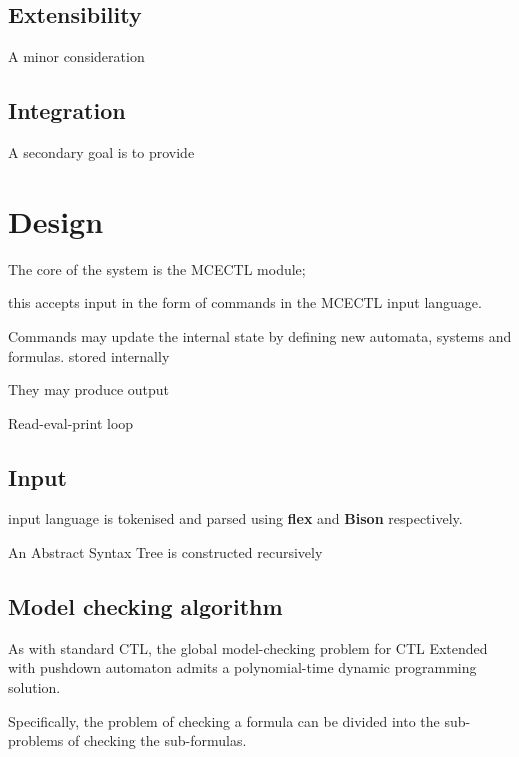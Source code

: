\documentclass[11pt]{article}
\begin{document}
\subsection{Extensibility}

A minor consideration 

\subsection{Integration}
A secondary goal is to provide 

\section{Design}







The core of the system is the MCECTL module; 

this accepts input in the form of commands in the MCECTL input language. 

Commands may update the internal state by defining new automata, systems and formulas.
stored internally

They may produce output

Read-eval-print loop


\subsection{Input}
input language is tokenised and parsed using \textbf{flex} and \textbf{Bison} respectively. 

An Abstract Syntax Tree is constructed recursively 




\subsection{Model checking algorithm}

As with standard CTL, the global model-checking problem for CTL Extended with
pushdown automaton admits a polynomial-time dynamic programming solution.

Specifically, the problem of checking a formula can be divided into the
sub-problems of checking the sub-formulas. %
\end{document}

